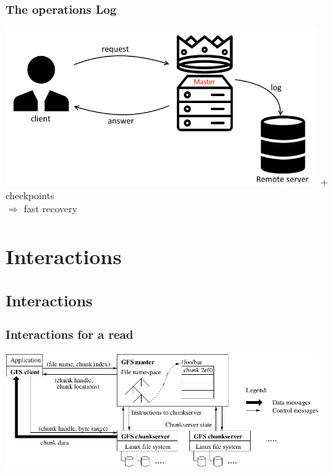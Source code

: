 \documentclass{beamer}
\newcommand{\slidewidth}{12cm}
\begin{document}
\begin{frame}
 \frametitle{The operations Log}
 \begin{center}
 \includegraphics[height=6cm]{figures/logschema.png}
 \alert{+ checkpoints}\\
 $\Rightarrow$ fast recovery
 \end{center}
\end{frame}

\section{Interactions}
\subsection{Interactions}
\begin{frame}
 \frametitle{Interactions for a read}
 \centering
 \includegraphics[width=\slidewidth]{figures/GFSarchitecture.png}
\end{frame}
\end{document}
